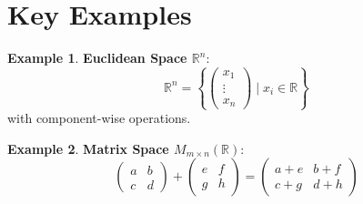 \documentclass{article}
\theoremstyle{plain}
\theoremstyle{definition}
\newtheorem{example}{Example}[section]
\theoremstyle{remark}
\newcommand{\thmheader}[1]{%
  \textcolor{#1}{\normalfont\bfseries}%
}
\begin{document}
\section{Key Examples}
\begin{example}
\thmheader{excolor}\textbf{Euclidean Space $\mathbb{R}^n$}:
\[
\mathbb{R}^n = \left\{ \begin{pmatrix} x_1 \\ \vdots \\ x_n \end{pmatrix} \mid x_i \in \mathbb{R} \right\}
\]
with component-wise operations.
\end{example}

\begin{example}
\thmheader{excolor}\textbf{Matrix Space $M_{m \times n}(\mathbb{R})$}:
\[
\begin{pmatrix} a & b \\ c & d \end{pmatrix} + \begin{pmatrix} e & f \\ g & h \end{pmatrix} = \begin{pmatrix} a+e & b+f \\ c+g & d+h \end{pmatrix}
\]
\end{example}
\end{document}
